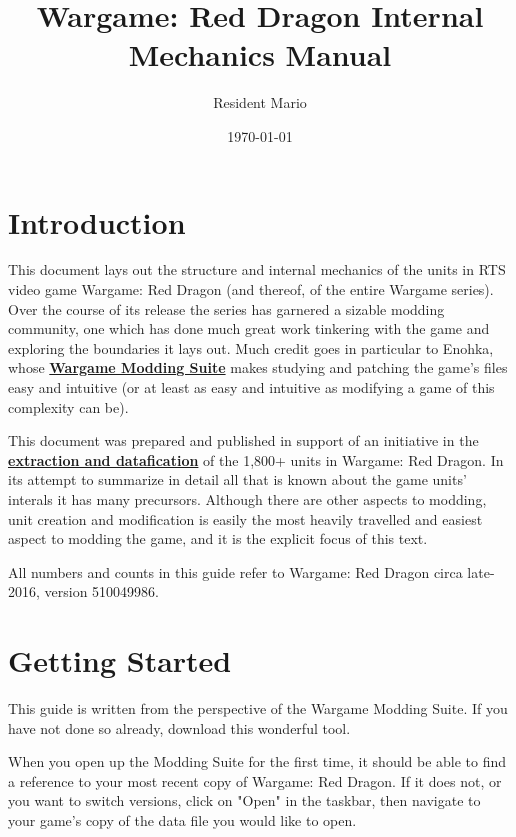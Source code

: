 \documentclass{article}
\begin{document}
\newcommand{\link}[2]{\textbf{\href{#1}{#2}}}

\title{Wargame: Red Dragon Internal Mechanics Manual}
\date{\today}
\author{Resident Mario}
\maketitle

\newpage
\tableofcontents
\newpage

\section{Introduction}

This document lays out the structure and internal mechanics of the units in RTS video game Wargame: Red Dragon (and thereof, of the entire Wargame series). Over the course of its release the series has garnered a sizable modding community, one which has done much great work tinkering with the game and exploring the boundaries it lays out. Much credit goes in particular to Enohka, whose \link{https://github.com/enohka/moddingSuite}{Wargame Modding Suite} makes studying and patching the game's files  easy and intuitive (or at least as easy and intuitive as modifying a game of this complexity can be).

This document was prepared and published in support of an initiative in the \link{https://github.com/ResidentMario/wargame-data}{extraction and datafication} of the 1,800+ units in Wargame: Red Dragon. In its attempt to summarize in detail all that is known about the game units' interals it has many precursors. Although there are other aspects to modding, unit creation and modification is easily the most heavily travelled and easiest aspect to modding the game, and it is the explicit focus of this text.

All numbers and counts in this guide refer to Wargame: Red Dragon circa late-2016, version 510049986.

\newpage

\section{Getting Started}

This guide is written from the perspective of the Wargame Modding Suite. If you have not done so already, download this wonderful tool.

When you open up the Modding Suite for the first time, it should be able to find a reference to your most recent copy of Wargame: Red Dragon. If it does not, or you want to switch versions, click on "Open" in the taskbar, then navigate to your game's copy of the data file you would like to open.
\end{document}
